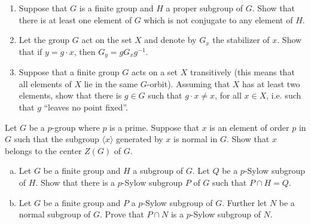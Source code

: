\documentclass{article}
\newcounter{Problem}
\newenvironment{Problem}{\begin{Exercise}[name={Problem},
                                          counter={Problem}]}
                        {\end{Exercise}}
\begin{document}
\pagebreak
\begin{Problem}
\begin{enumerate}
  \item{Suppose that $G$ is a finite group and $H$ a proper subgroup
      of $G$. Show that there is at least one element of $G$ which is
      not conjugate to any element of $H$.}
  \item{Let the group $G$ act on the set $X$ and denote by $G_x$ the
      stabilizer of $x$. Show that if $y = g \cdot x$, then $G_y = g
      G_x g^{-1}$.}
  \item{Suppose that a finite group $G$ acts on a set $X$ transitively
      (this means that all elements of $X$ lie in the same
      $G$-orbit). Assuming that $X$ has at least two elements, show
      that there is $g \in G$ such that $g \cdot x \neq x$, for all $x
      \in X$, 
      i.e. such that $g$ ``leaves no point fixed''.}
\end{enumerate}
\end{Problem}

\pagebreak
\begin{Problem}
Let $G$ be a $p$-group where $p$ is a prime. Suppose that $x$ is an
element of order $p$ in $G$ such that the subgroup $\langle x \rangle$
generated by $x$ is normal in $G$. Show that $x$ belongs to the center
$Z(G)$ of $G$.
\end{Problem}

\begin{Answer}
\end{Answer}

\pagebreak
\begin{Problem}
\begin{enumerate}[(a)]
\item{Let $G$ be a finite group and $H$ a subgroup of $G$. Let $Q$ be
    a $p$-Sylow subgroup of $H$. Show that there is a $p$-Sylow
    subgroup $P$ of $G$ such that $P \cap H = Q$.}
\item{Let $G$ be a finite group and $P$ a $p$-Sylow subgroup of
    $G$. Further let $N$ be a normal subgroup of $G$. Prove that $P
    \cap N$ is a $p$-Sylow subgroup of $N$.}
\end{enumerate}
\end{Problem}

\begin{Answer}
\end{Answer}
\end{document}
